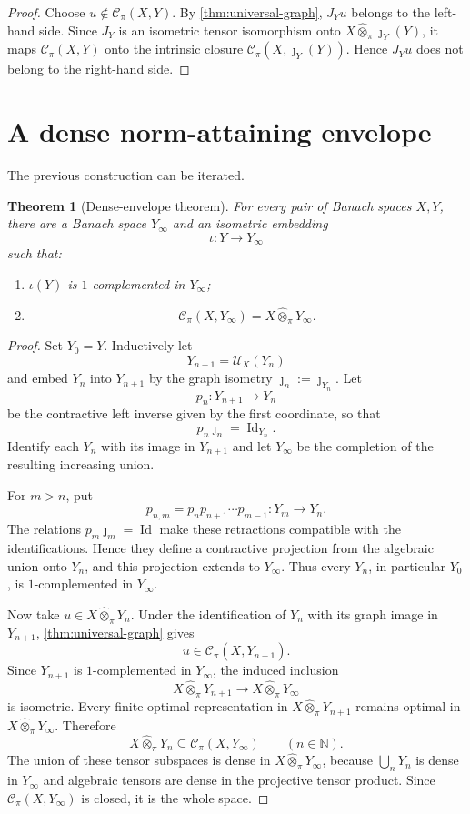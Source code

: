 \documentclass[11pt]{article}
\newtheorem{theorem}{Theorem}[section]
\theoremstyle{definition}
\theoremstyle{remark}
\newcommand{\N}{\mathbb N}
\newcommand{\whot}{\widehat\otimes_\pi}
\newcommand{\id}{\operatorname{Id}}
\newcommand{\Cpi}{\mathscr C_\pi}
\newcommand{\U}{\mathcal U}
\begin{document}
\begin{proof}
Choose $u\notin\Cpi(X,Y)$.  By \cref{thm:universal-graph}, $J_Yu$ belongs to the left-hand side.  Since $J_Y$ is an isometric tensor isomorphism onto $X\whot\jmath_Y(Y)$, it maps $\Cpi(X,Y)$ onto the intrinsic closure $\Cpi(X,\jmath_Y(Y))$.  Hence $J_Yu$ does not belong to the right-hand side.
\end{proof}

\section{A dense norm-attaining envelope}

The previous construction can be iterated.

\begin{theorem}[Dense-envelope theorem]\label{thm:envelope}
For every pair of Banach spaces $X,Y$, there are a Banach space $Y_\infty$ and an isometric embedding
\[
 \iota:Y\longrightarrow Y_\infty
\]
such that:
\begin{enumerate}[label=\textup{(\roman*)}]
\item $\iota(Y)$ is $1$-complemented in $Y_\infty$;
\item
\[
 \Cpi(X,Y_\infty)=X\whot Y_\infty.
\]
\end{enumerate}
\end{theorem}

\begin{proof}
Set $Y_0=Y$.  Inductively let
\[
 Y_{n+1}=\U_X(Y_n)
\]
and embed $Y_n$ into $Y_{n+1}$ by the graph isometry $\jmath_n:=\jmath_{Y_n}$.  Let
\[
 p_n:Y_{n+1}\longrightarrow Y_n
\]
be the contractive left inverse given by the first coordinate, so that
\[
 p_n\jmath_n=\id_{Y_n}.
\]
Identify each $Y_n$ with its image in $Y_{n+1}$ and let $Y_\infty$ be the completion of the resulting increasing union.

For $m>n$, put
\[
 p_{n,m}=p_n p_{n+1}\cdots p_{m-1}:Y_m\to Y_n.
\]
The relations $p_m\jmath_m=\id$ make these retractions compatible with the identifications.  Hence they define a contractive projection from the algebraic union onto $Y_n$, and this projection extends to $Y_\infty$.  Thus every $Y_n$, in particular $Y_0$, is $1$-complemented in $Y_\infty$.

Now take $u\in X\whot Y_n$.  Under the identification of $Y_n$ with its graph image in $Y_{n+1}$, \cref{thm:universal-graph} gives
\[
 u\in\Cpi(X,Y_{n+1}).
\]
Since $Y_{n+1}$ is $1$-complemented in $Y_\infty$, the induced inclusion
\[
 X\whot Y_{n+1}\longrightarrow X\whot Y_\infty
\]
is isometric.  Every finite optimal representation in $X\whot Y_{n+1}$ remains optimal in $X\whot Y_\infty$.  Therefore
\[
 X\whot Y_n\subseteq\Cpi(X,Y_\infty)
\qquad(n\in\N).
\]
The union of these tensor subspaces is dense in $X\whot Y_\infty$, because $\bigcup_nY_n$ is dense in $Y_\infty$ and algebraic tensors are dense in the projective tensor product.  Since $\Cpi(X,Y_\infty)$ is closed, it is the whole space.
\end{proof}
\end{document}
